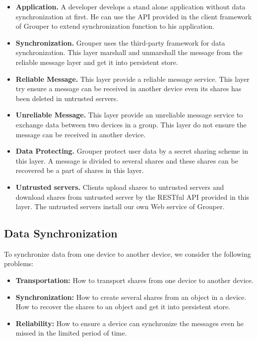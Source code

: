 \documentclass[twocolumn,10pt]{article}
\begin{document}
\begin{itemize}
	\setlength{\itemsep}{1pt}
	\setlength{\parskip}{0pt}
	\setlength{\parsep}{0pt}
	\item \textbf{Application.}
	A developer develops a stand alone application without data synchronization at first. 
	He can use the API provided in the client framework of Grouper to extend synchronization function to his application.
	\item \textbf{Synchronization.} 
	Grouper uses the third-party framework for data synchronization.
	This layer marshall and unmarshall the message from the reliable message layer and get it into persistent store.
	\item \textbf{Reliable Message.}
	This layer provide a reliable message service.
	This layer try ensure a message can be received in another device even its shares has been deleted in untrusted servers.
	\item \textbf{Unreliable Message.}
	This layer provide an unreliable message service to exchange data between two devices in a group.
	This layer do not ensure the message can be received in another device.
	\item \textbf{Data Protecting.}
	Grouper protect user data by a secret sharing scheme in this layer.
	A message is divided to several shares and these shares can be recovered be a part of shares in this layer.
	\item \textbf{Untrusted servers.}
	Clients upload shares to untrusted servers and download shares from untrusted server by the RESTful API provided in this layer.
	The untrusted servers install our own Web service of Grouper.
\end{itemize}

\subsection{Data Synchronization}

To synchronize data from one device to another device, we consider the following problems:

\begin{itemize}
	\setlength{\itemsep}{1pt}
	\setlength{\parskip}{0pt}
	\setlength{\parsep}{0pt}
	\item \textbf{Transportation:}
	How to transport shares from one device to another device.
	\item \textbf{Synchronization: } 
	How to create several shares from an object in a device. 
	How to recover the shares to an object and get it into persistent store.
	\item \textbf{Reliability:}
	How to ensure a device can synchronize the messages even he missed in the limited period of time. 
\end{itemize}
\end{document}
